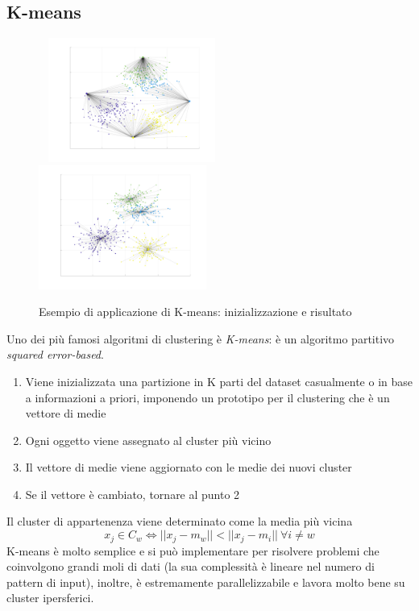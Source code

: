 \documentclass[\main/main.tex]{subfiles}
\begin{document}
\subsection{K-means}
\begin{figure} \centering
	\caption{Esempio di applicazione di K-means: inizializzazione e risultato}
	\label{fig:kmeans}
	\ \newline
	\includegraphics[width=0.49\textwidth,trim={2.5in 1.25in 1.5in 1.2in},clip]{../images/kmeans_0.pdf}
	\includegraphics[width=0.49\textwidth,trim={2.5in 1.25in 1.5in 1.2in},clip]{../images/kmeans_f.pdf}
\end{figure}
Uno dei più famosi algoritmi di clustering è \textit{K-means}: è un algoritmo partitivo \textit{squared error-based}.\begin{enumerate}
	\item Viene inizializzata una partizione in K parti del dataset casualmente o in base a informazioni a priori, imponendo un prototipo per il clustering che è un vettore di medie
	\item Ogni oggetto viene assegnato al cluster più vicino
	\item Il vettore di medie viene aggiornato con le medie dei nuovi cluster
	\item Se il vettore è cambiato, tornare al punto 2
\end{enumerate}
Il cluster di appartenenza viene determinato come la media più vicina
$$ x_j \in C_w \Leftrightarrow ||x_j-m_w||<||x_j-m_i|| \ \forall i \neq w $$
K-means è molto semplice e si può implementare per risolvere problemi che coinvolgono grandi moli di dati (la sua complessità è lineare nel numero di pattern di input), inoltre, è estremamente parallelizzabile e lavora molto bene su cluster ipersferici.
\end{document}
